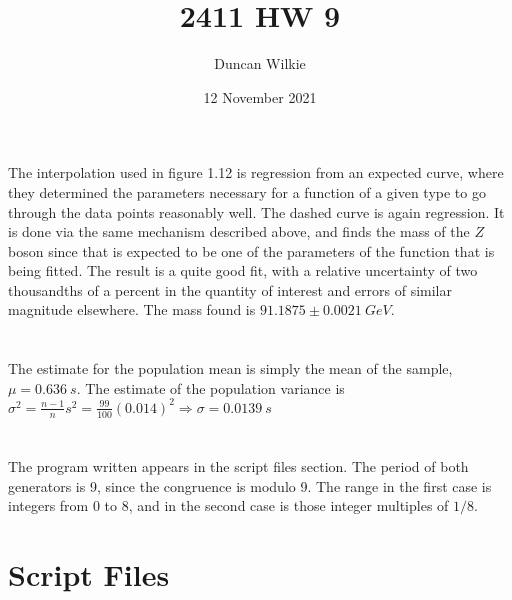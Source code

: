 \documentclass{article}
\title{2411 HW 9}
\author{Duncan Wilkie}
\date{12 November 2021}
\begin{document}
\maketitle

\section{}
The interpolation used in figure 1.12 is regression from an expected curve, where they determined the parameters necessary for a function of a given type to go through the data points reasonably well. The dashed curve is again regression. It is done via the same mechanism described above, and finds the mass of the $Z$ boson since that is expected to be one of the parameters of the function that is being fitted. The result is a quite good fit, with a relative uncertainty of two thousandths of a percent in the quantity of interest and errors of similar magnitude elsewhere. The mass found is $91.1875\pm \SI{ 0.0021}{GeV}$.

\section{}


\section{}
The estimate for the population mean is simply the mean of the sample, $\mu = \SI{0.636}{s}$. The estimate of the population variance is $\sigma^2 = \frac{n-1}{n}s^2=\frac{99}{100}(0.014)^2\Rightarrow \sigma=\SI{0.0139}{s}$

\section{}
The program written appears in the script files section. The period of both generators is 9, since the congruence is modulo 9. The range in the first case is integers from 0 to 8, and in the second case is those integer multiples of $1/8$.

\section{Script Files}
\end{document}
